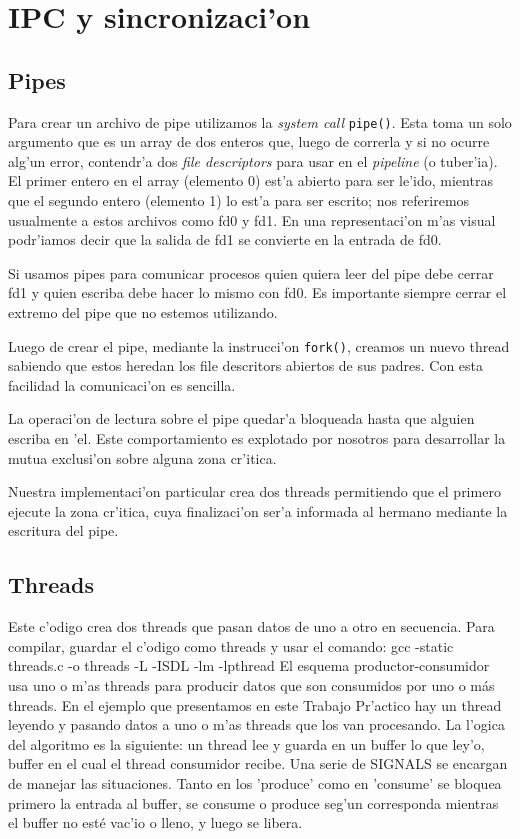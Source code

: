 \section{IPC y sincronizaci'on}
\subsection{Pipes}
Para crear un archivo de pipe utilizamos la \textit{system call} \texttt{pipe()}. Esta toma un solo argumento que es un array de dos enteros que, luego de correrla y si no ocurre alg'un error, contendr'a dos \textit{file descriptors} para usar en el \textit{pipeline} (o tuber'ia). El primer entero en el array (elemento 0) est'a abierto para ser le'ido, mientras que el segundo entero (elemento 1) lo est'a para ser escrito; nos referiremos usualmente a estos archivos como fd0 y fd1. En una representaci'on m'as visual podr'iamos decir que la salida de fd1 se convierte en la entrada de fd0.

Si usamos pipes para comunicar procesos quien quiera leer del pipe debe cerrar fd1 y quien escriba debe hacer lo mismo con fd0. Es importante siempre cerrar el extremo del pipe que no estemos utilizando.

Luego de crear el pipe, mediante la instrucci'on \texttt{fork()}, creamos un nuevo thread sabiendo que estos heredan los file descritors abiertos de sus padres. Con esta facilidad la comunicaci'on es sencilla.

La operaci'on de lectura sobre el pipe quedar'a bloqueada hasta que alguien escriba en 'el. Este comportamiento es explotado por nosotros para desarrollar la mutua exclusi'on sobre alguna zona cr'itica.

Nuestra implementaci'on particular crea dos threads permitiendo que el primero ejecute la zona cr'itica, cuya finalizaci'on ser'a informada al hermano mediante la escritura del pipe. 


\subsection{Threads}
Este c'odigo crea dos threads que pasan datos de uno a otro en secuencia. Para compilar, guardar el c'odigo como threads y usar el comando:
gcc -static threads.c -o threads -L -ISDL -lm -lpthread
El esquema productor-consumidor usa uno o m'as threads para producir datos que son consumidos por uno o más threads. En el ejemplo que presentamos en este Trabajo Pr'actico  hay un thread leyendo y pasando datos a uno o m'as threads que los van procesando.
La l'ogica del algoritmo es la siguiente: un thread lee y guarda en un buffer lo que ley'o, buffer en el  cual el thread consumidor recibe. Una serie de SIGNALS se encargan de manejar las situaciones. Tanto en los 'produce' como en 'consume' se bloquea primero la entrada al buffer, se consume o produce seg'un corresponda mientras el buffer no esté vac'io o lleno, y luego se libera.


